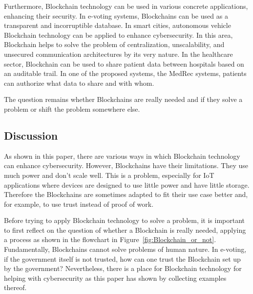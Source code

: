Furthermore, Blockchain technology can be used in various concrete applications, enhancing their security.
In e-voting systems, Blockchains can be used as a transparent and incorruptible database.
In smart cities, autonomous vehicle Blockchain technology can be applied to enhance cybersecurity. In this area, Blockchain helps to solve the problem of centralization, unscalability, and unsecured communication architectures by its very nature.
In the healthcare sector, Blockchain can be used to share patient data between hospitals based on an auditable trail. In one of the proposed systems, the MedRec systems, patients can authorize what data to share and with whom.

The question remains whether Blockchains are really needed and if they solve a problem or shift the problem somewhere else.

\subsection{Discussion}

As shown in this paper, there are various ways in which Blockchain technology can enhance cybersecurity.
However, Blockchains have their limitations. They use much power and don't scale well. This is a problem, especially for IoT applications where devices are designed to use little power and have little storage. Therefore the Blockchains are sometimes adapted to fit their use case better and, for example, to use trust instead of proof of work.

Before trying to apply Blockchain technology to solve a problem, it is important to first reflect on the question of whether a Blockchain is really needed, applying a process as shown in the flowchart in Figure~\ref{fig:Blockchain_or_not}.
Fundamentally, Blockchains cannot solve problems of human nature. In e-voting, if the government itself is not trusted, how can one trust the Blockchain set up by the government? Nevertheless, there is a place for Blockchain technology for helping with cybersecurity as this paper has shown by collecting examples thereof.
